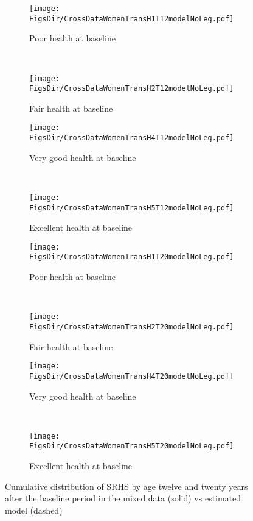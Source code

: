 \documentclass[12pt,pdftex,letterpaper]{article}
\newcommand{\RootDir}{..}
\newcommand{\FigsDir}{\RootDir/Figures}
\begin{document}
\begin{figure}[H]
	\centering
	\begin{subfigure}[b]{0.45\textwidth}
	    \texttt{[image: \\FigsDir/CrossDataWomenTransH1T12modelNoLeg.pdf]}
	    \caption{Poor health at baseline}\label{fig:Model12AheadPoor}
    \end{subfigure}
    ~
    \begin{subfigure}[b]{0.45\textwidth}
    	\texttt{[image: \\FigsDir/CrossDataWomenTransH2T12modelNoLeg.pdf]}
	    \caption{Fair health at baseline}\label{fig:Model12AheadFair}
    \end{subfigure}

    \begin{subfigure}[b]{0.45\textwidth}
    	\texttt{[image: \\FigsDir/CrossDataWomenTransH4T12modelNoLeg.pdf]}
    	\caption{Very good health at baseline}\label{fig:Model12AheadVeryGood}
    \end{subfigure}
    ~
    \begin{subfigure}[b]{0.45\textwidth}
    	\texttt{[image: \\FigsDir/CrossDataWomenTransH5T12modelNoLeg.pdf]}
	    \caption{Excellent health at baseline}\label{fig:Model12AheadExcellent}
    \end{subfigure}	
	
	\begin{subfigure}[b]{0.45\textwidth}
		\texttt{[image: \\FigsDir/CrossDataWomenTransH1T20modelNoLeg.pdf]}
		\caption{Poor health at baseline}\label{fig:Model20AheadPoor}
	\end{subfigure}
	~
	\begin{subfigure}[b]{0.45\textwidth}
		\texttt{[image: \\FigsDir/CrossDataWomenTransH2T20modelNoLeg.pdf]}
		\caption{Fair health at baseline}\label{fig:Model20AheadFair}
	\end{subfigure}
	
	\begin{subfigure}[b]{0.45\textwidth}
		\texttt{[image: \\FigsDir/CrossDataWomenTransH4T20modelNoLeg.pdf]}
		\caption{Very good health at baseline}\label{fig:Model20AheadVeryGood}
	\end{subfigure}
	~
	\begin{subfigure}[b]{0.45\textwidth}
		\texttt{[image: \\FigsDir/CrossDataWomenTransH5T20modelNoLeg.pdf]}
		\caption{Excellent health at baseline}\label{fig:Model20AheadExcellent}
	\end{subfigure}
	\caption{Cumulative distribution of SRHS by age twelve and twenty years after the baseline period in the mixed data (solid) vs estimated model (dashed)}\label{fig:ModelTransMixed20Ahead}
\end{figure}
\thispagestyle{empty}
\end{document}
